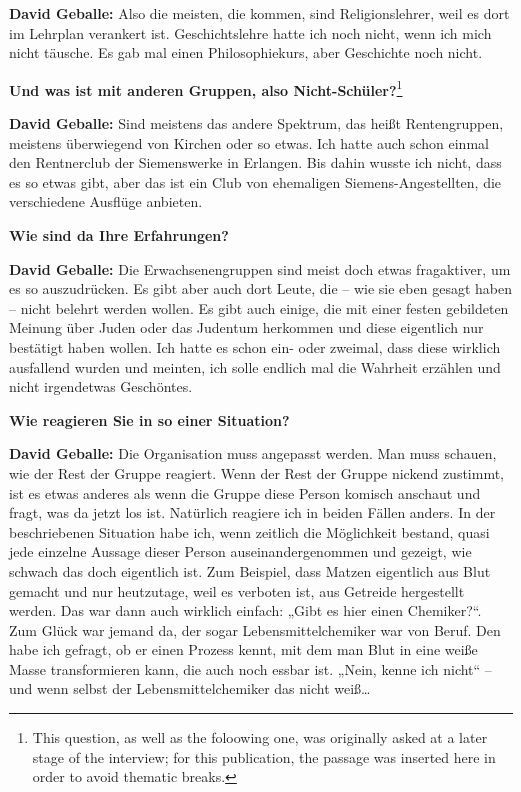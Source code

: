 \textbf{David Geballe:} Also die meisten, die kommen, sind Religionslehrer, weil es dort im Lehrplan verankert ist. Geschichtslehre hatte ich noch nicht, wenn ich mich nicht täusche. Es gab mal einen Philosophiekurs, aber Geschichte noch nicht. 

\textbf{Und was ist mit anderen Gruppen, also Nicht-Schüler?}\footnote{This question, as well as the foloowing one, was originally asked at a later stage of the interview; for this publication, the passage was inserted here in order to avoid thematic breaks.} 

\textbf{David Geballe:} Sind meistens das andere Spektrum, das heißt Rentengruppen, meistens überwiegend von Kirchen oder so etwas. Ich hatte auch schon einmal den Rentnerclub der Siemenswerke in Erlangen. Bis dahin wusste ich nicht, dass es so etwas gibt, aber das ist ein Club von ehemaligen Siemens-Angestellten, die verschiedene Ausflüge anbieten. 

\textbf{Wie sind da Ihre Erfahrungen?} 

\textbf{David Geballe:} Die Erwachsenengruppen sind meist doch etwas fragaktiver, um es so auszudrücken. Es gibt aber auch dort Leute, die – wie sie eben gesagt haben – nicht belehrt werden wollen. Es gibt auch einige, die mit einer festen gebildeten Meinung über Juden oder das Judentum herkommen und diese eigentlich nur bestätigt haben wollen. Ich hatte es schon ein- oder zweimal, dass diese wirklich ausfallend wurden und meinten, ich solle endlich mal die Wahrheit erzählen und nicht irgendetwas Geschöntes. 

\textbf{Wie reagieren Sie in so einer Situation?} 

\textbf{David Geballe:} Die Organisation muss angepasst werden. Man muss schauen, wie der Rest der Gruppe reagiert. Wenn der Rest der Gruppe nickend zustimmt, ist es etwas anderes als wenn die Gruppe diese Person komisch anschaut und fragt, was da jetzt los ist. Natürlich reagiere ich in beiden Fällen anders. 
In der beschriebenen Situation habe ich, wenn zeitlich die Möglichkeit bestand, quasi jede einzelne Aussage dieser Person auseinandergenommen und gezeigt, wie schwach das doch eigentlich ist. Zum Beispiel, dass Matzen eigentlich aus Blut gemacht und nur heutzutage, weil es verboten ist, aus Getreide hergestellt werden. Das war dann auch wirklich einfach: „Gibt es hier einen Chemiker?“. Zum Glück war jemand da, der sogar Lebensmittelchemiker war von Beruf. Den habe ich gefragt, ob er einen Prozess kennt, mit dem man Blut in eine weiße Masse transformieren kann, die auch noch essbar ist. „Nein, kenne ich nicht“ – und wenn selbst der Lebensmittelchemiker das nicht weiß… 

